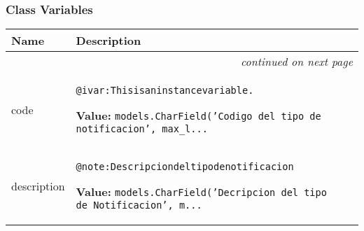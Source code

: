 
  \subsubsection{Class Variables}

    \vspace{-1cm}
\hspace{\varindent}\begin{longtable}{|p{\varnamewidth}|p{\vardescrwidth}|l}
\cline{1-2}
\cline{1-2} \centering \textbf{Name} & \centering \textbf{Description}& \\
\cline{1-2}
\endhead\cline{1-2}\multicolumn{3}{r}{\small\textit{continued on next page}}\\\endfoot\cline{1-2}
\endlastfoot\raggedright c\-o\-d\-e\- & \raggedright \begin{alltt}
@ivar: This is an instance variable.
\end{alltt}

\textbf{Value:} 
{\tt models.CharField('Codigo del tipo de notificacion', max\_l\texttt{...}}&\\
\cline{1-2}
\raggedright d\-e\-s\-c\-r\-i\-p\-t\-i\-o\-n\- & \raggedright \begin{alltt}

@note: Descripcion del tipo de notificacion
\end{alltt}

\textbf{Value:} 
{\tt models.CharField('Decripcion del tipo de Notificacion', m\texttt{...}}&\\
\cline{1-2}
\end{longtable}

